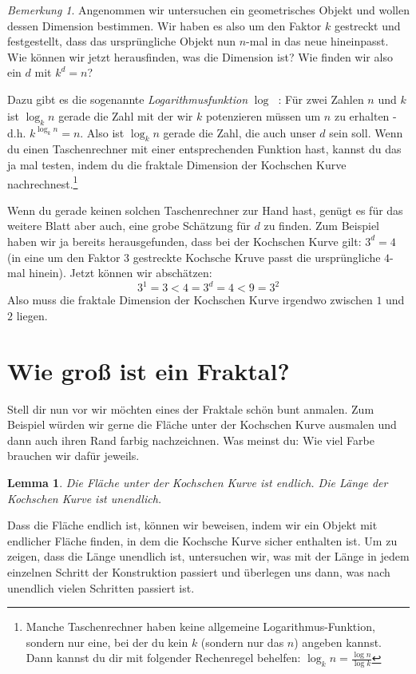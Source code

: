\documentclass[a4paper,ngerman,12pt]{scrartcl}
\theoremstyle{definition}
\theoremstyle{plain}
\newtheorem{lemma}[defn]{Lemma}
\theoremstyle{remark}
\newtheorem{bem}[defn]{Bemerkung}
\begin{document}
\begin{bem}
	Angenommen wir untersuchen ein geometrisches Objekt und wollen dessen Dimension bestimmen. Wir haben es also um den Faktor $k$ gestreckt und festgestellt, dass das ursprüngliche Objekt nun $n$-mal in das neue hineinpasst. Wie können wir jetzt herausfinden, was die Dimension ist? Wie finden wir also ein $d$ mit $k^d = n$?
	
	Dazu gibt es die sogenannte \emph{Logarithmusfunktion} $\log_{\boxed{}}\boxed{\phantom{k}}$: Für zwei Zahlen $n$ und $k$ ist $\log_k n$ gerade die Zahl mit der wir $k$ potenzieren müssen um $n$ zu erhalten - d.h. $k^{\log_k n} = n$. Also ist $\log_k n$ gerade die Zahl, die auch unser $d$ sein soll. Wenn du einen Taschenrechner mit einer entsprechenden Funktion hast, kannst du das ja mal testen, indem du die fraktale Dimension der Kochschen Kurve nachrechnest.\footnote{Manche Taschenrechner haben keine allgemeine Logarithmus-Funktion, sondern nur eine, bei der du kein $k$ (sondern nur das $n$) angeben kannst. Dann kannst du dir mit folgender Rechenregel behelfen: $\log_k n = \frac{\log n}{\log k}$}
	
	Wenn du gerade keinen solchen Taschenrechner zur Hand hast, genügt es für das weitere Blatt aber auch, eine grobe Schätzung für $d$ zu finden. Zum Beispiel haben wir ja bereits herausgefunden, dass bei der Kochschen Kurve gilt: $3^d=4$ (in eine um den Faktor $3$ gestreckte Kochsche Kruve passt die ursprüngliche $4$-mal hinein). Jetzt können wir abschätzen:
	\[3^1 = 3 < 4 = 3^d = 4 < 9 = 3^2\]
	Also muss die fraktale Dimension der Kochschen Kurve irgendwo zwischen $1$ und $2$ liegen.
\end{bem}

\section{Wie groß ist ein Fraktal?}

Stell dir nun vor wir möchten eines der Fraktale schön bunt anmalen. Zum Beispiel würden wir gerne die Fläche unter der Kochschen Kurve ausmalen und dann auch ihren Rand farbig nachzeichnen. Was meinst du: Wie viel Farbe brauchen wir dafür jeweils.

\begin{lemma}
	Die Fläche unter der Kochschen Kurve ist endlich. Die Länge der Kochschen Kurve ist unendlich.
\end{lemma}

Dass die Fläche endlich ist, können wir beweisen, indem wir ein Objekt mit endlicher Fläche finden, in dem die Kochsche Kurve sicher enthalten ist. Um zu zeigen, dass die Länge unendlich ist, untersuchen wir, was mit der Länge in jedem einzelnen Schritt der Konstruktion passiert und überlegen uns dann, was nach unendlich vielen Schritten passiert ist.
\end{document}
